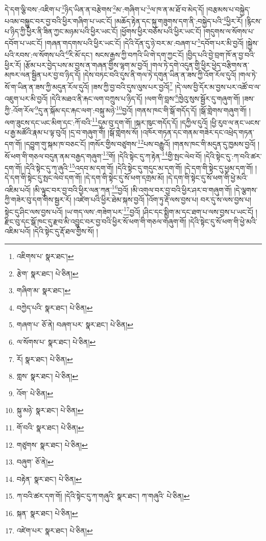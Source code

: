 དེ་དག་ལྕི་བས་:འཇིག་པ་\footnote{འཇིགས་པ་  སྣར་ཐང་། }ཉིད་ཡིན་ན་བརྩེགས་\footnote{རྩེག་  སྣར་ཐང་།  པེ་ཅིན། }མ་:གཞིག་པ་\footnote{གཞིག་མ་  སྣར་ཐང་། }ལ་ཁ་ན་མ་ཐོ་བ་མེད་དོ། །བརྩམས་པ་བསྐྱེད་པའམ་བསྐྱུང་བར་བྱ་བའི་ཕྱིར་གཞིག་པ་ཡང་ངོ། །མཆོད་རྟེན་དང་སྐུ་གཟུགས་དག་ནི་:བསྐྱེད་པའི་\footnote{བཀྱེད་པའི་  སྣར་ཐང་།  པེ་ཅིན། }ཕྱིར་རོ། །རྙིངས་པ་ཉིད་ཀྱི་ཕྱིར་ནི་ཟིན་ཀྱང་མཉམ་པའི་ཕྱིར་ཡང་ངོ། །ཕྱོགས་ཕྱིར་བཅོས་པའི་ཕྱིར་ཡང་ངོ། །གདུགས་ལ་སོགས་པ་དབོག་པ་ཡང་ངོ། །གཞན་གདགས་པའི་ཕྱིར་ཡང་ངོ། །དེའི་དོན་དུ་ཉེ་བར་མ་:བཞག་པ་\footnote{གཞག་པ་  ཅོ་ནེ། བཞག་པར་  སྣར་ཐང་།  པེ་ཅིན། }དབོག་པར་མི་བྱའོ། །སྐྱེས་པའི་རབས་:ལ་སོགས་པའི་\footnote{ལ་སོགས་པ་  སྣར་ཐང་།  པེ་ཅིན། }རི་མོ་དང་། སངས་རྒྱས་ཀྱི་བཀའི་ཡི་གེ་དག་ཀྱང་ངོ། །བྱིད་པའི་བྱེ་བྲག་ཁོ་ན་བྱ་བའི་ཕྱིར་རོ། །རྩོམ་པར་བྱེད་པས་མ་བྱས་ན་གཞན་གྱིས་ལྷག་མ་བྱའོ། །གལ་ཏེ་དགེ་འདུན་གྱི་ཕྱིར་ཕྱེད་བརྩིགས་ན་མཁར་ལན་སྦྱིན་པར་བྱ་བ་ཉིད་དོ། །དེས་བཏང་བའི་དུས་ནི་གལ་ཏེ་དགུན་ཡིན་ན་ཟས་ཀྱི་འོག་རོལ་དུའོ། །གལ་ཏེ་སོ་ག་ཡིན་ན་ཟས་ཀྱི་མདུན་རོལ་དུའོ། །ཟས་ཀྱི་བྱ་བའི་དུས་ལུས་པར་བྱའོ།\footnote{རོ།  སྣར་ཐང་།  པེ་ཅིན། } །དེ་ལས་བྱི་དོར་མ་བྱས་པར་འཚོ་བ་ལ་འཇུག་པར་མི་བྱའོ། །དེའི་མཐའ་ནི་རྐང་ལག་བཀྲུས་པ་ཉིད་དོ། །ལག་གི་བླས་\footnote{གླས་  སྣར་ཐང་།  པེ་ཅིན། }ཁྱེའུ་སུས་སྦྱོར་དུ་གཞུག་གོ། །ཟས་ཀྱི་:འོག་རོལ་\footnote{འོག་  པེ་ཅིན། }དུ་ན་སྐོམ་དང་རྐང་ལག་:བསྐུ་མཉེ་\footnote{སྐུ་མཉེ་  སྣར་ཐང་།  པེ་ཅིན། }བྱའོ། །གནས་ཁང་གི་སྒོ་གདོད་དོ། །སྒོ་གླེགས་གཞུག་གོ། །ལག་ཟུངས་དང་ཡང་མིག་དང་:ཀོ་བའི་\footnote{གོ་བའི་  སྣར་ཐང་།  པེ་ཅིན། }དུམ་བུ་དག་གོ། །སྐར་ཁུང་གདོད་དོ། །དཀྱིལ་དུའོ། །ཕྱི་རུབ་ལ་ནང་ཡངས་པ་རྒྱ་མཚོའི་རྣམ་པ་ལྟ་བུའོ། །དྲ་བ་གཞུག་གོ། །སྒོ་གླེགས་སོ། །འཁོར་གཏན་དང་གནམ་གཟེར་དང་འཕྲེད་གཏན་དག་གོ། །དབྱུག་གུ་སྐམ་ཁ་བཅང་ངོ། །གསོར་གྱིས་བཙུགས་\footnote{གཙུགས་  སྣར་ཐང་།  པེ་ཅིན། }པས་བརྒྱུའོ། །གནས་ཁང་གི་མདུན་དུ་ཁྱམས་བྱའོ། །སོ་ཕག་གི་གཅལ་བདུན་ནམ་བརྒྱད་གཞུག་\footnote{བཞུག་  ཅོ་ནེ། }གོ། །དེའི་སྟེང་དུ་ཀ་རྟེན་\footnote{བརྟེན་  སྣར་ཐང་།  པེ་ཅིན། }གྱི་སྤང་ལེབ་བོ། །དེའི་སྟེང་དུ་:ཀ་བའི་ཚར་དག་གོ། །དེའི་སྟེང་དུ་ཀ་ཞུའི་\footnote{ཀ་བའི་ཚར་དག་གོ། །དེའི་སྟེང་དུ་ཀ་གཞུའི་  སྣར་ཐང་། ཀ་གཞུའི་  པེ་ཅིན། }འདབ་མ་དག་གོ། །དེའི་སྟེང་དུ་གདུང་མ་དག་གོ། །དེ་དག་གི་སྟེང་དུ་ཕྱམ་དག་གོ། །དེ་དག་གི་སྟེང་དུ་སྤང་ལེབ་དག་གོ། །དེ་དག་གི་སྟེང་དུ་སོ་ཕག་དགྲམ་མོ། །དེ་དག་གི་སྟེང་དུ་སོ་ཕག་གི་ཕྱེ་མའི་འཇིམ་པའོ། །མི་ལྟུང་བར་བྱ་བའི་ཕྱིར་ལན་ཀན་\footnote{སྐན་  སྣར་ཐང་།  པེ་ཅིན། }བྱའོ། །མི་འགུལ་བར་བྱ་བའི་ཕྱིར་ཤར་བ་གཞུག་གོ། །དེ་ལྕགས་ཀྱི་གཟེར་བུ་དག་གིས་སྦྱར་རོ། །འཛེག་པའི་ཕྱིར་ཐེམ་སྐས་བྱའོ། །འོག་ཏུ་རྡོ་ལས་བྱས་པ། བར་དུ་ས་ལས་བྱས་པ། སྟེང་དུ་ཤིང་ལས་བྱས་པའོ། །ཡ་གད་ལས་:གཟེག་པར་\footnote{འཛེག་པར་  སྣར་ཐང་།  པེ་ཅིན། }བྱའོ། །ཤིང་དང་སྨྱིག་མ་དང་ཐག་པ་ལས་བྱས་པ་ཡང་ངོ། །རྫིང་བུ་དང་སྒོ་ཁང་དུ་རྫབ་མི་འབྱུང་བར་བྱ་བའི་ཕྱིར་སོ་ཕག་གི་གཅལ་གཞུག་གོ། །དེའི་སྟེང་དུ་སོ་ཕག་གི་ཕྱེ་མའི་འཇིམ་པའོ། །དེའི་སྟེང་དུ་རྡོ་ཐལ་གྱིས་སོ། །
